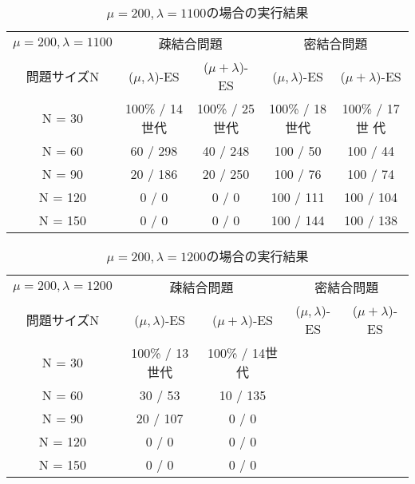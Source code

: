 \documentclass[a4j]{jarticle}
\begin{document}
\begin{table}[htb]
 \begin{center}
  \begin{tabular}[tb]{|c||c|c||c|c|} \hline
   $\mu = 200, \lambda = 1100$& \multicolumn{2}{c||}{疎結合問題} &
   \multicolumn{2}{c|}{密結合問題} \\ \cline{2-5}
   問題サイズN& ($\mu, \lambda$)-ES& ($\mu + \lambda$)-ES& ($\mu, \lambda$)-ES&
   ($\mu + \lambda$)-ES \\ \hline \hline
   N = 30& 100\% / 14世代& 100\% / 25世代& 100\% / 18世代& 100\% / 17世
   代\\ \hline
   N = 60& 60 / 298& 40 / 248& 100 / 50& 100 / 44\\ \hline
   N = 90& 20 / 186&20 / 250 & 100 / 76& 100 / 74\\ \hline
   N = 120& 0 / 0&0 / 0 & 100 / 111& 100 / 104\\ \hline
   N = 150& 0 / 0&0 / 0 & 100 / 144& 100 / 138\\ \hline
  \end{tabular}
  \caption{$\mu = 200, \lambda = 1100$の場合の実行結果}
  \label{211}
 \end{center}
\end{table}

\begin{table}[htb]
 \begin{center}
  \begin{tabular}[tb]{|c||c|c||c|c|} \hline
   $\mu = 200, \lambda = 1200$& \multicolumn{2}{c||}{疎結合問題} &
   \multicolumn{2}{c|}{密結合問題} \\ \cline{2-5}
   問題サイズN& ($\mu, \lambda$)-ES& ($\mu + \lambda$)-ES& ($\mu, \lambda$)-ES&
   ($\mu + \lambda$)-ES \\ \hline \hline
   N = 30& 100\% / 13世代& 100\% / 14世代& & \\ \hline
   N = 60& 30 / 53& 10 / 135& & \\ \hline
   N = 90& 20 / 107&0 / 0 & & \\ \hline
   N = 120& 0 / 0&0 / 0 & & \\ \hline
   N = 150& 0 / 0&0 / 0 & & \\ \hline
  \end{tabular}
  \caption{$\mu = 200, \lambda = 1200$の場合の実行結果}
  \label{212}
 \end{center}
\end{table}
\end{document}

